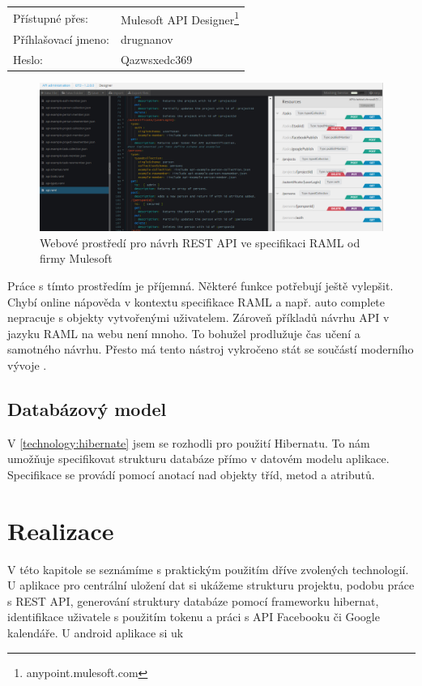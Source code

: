 \documentclass[thesis=B,czech]{FITthesis}[2012/06/26]
\begin{document}
\begin{tabular}{l l}
	Přístupné přes:&Mulesoft API Designer\footnote{anypoint.mulesoft.com}\\
	Příhlašovací jmeno:&drugnanov\\
	Heslo:&Qazwsxedc369\\
\end{tabular}

\begin{figure}[h!]\centering
	\includegraphics[width=1\textwidth]{pictures/gtd_raml_anypoint}
	\caption{Webové prostředí pro návrh REST API ve specifikaci RAML od firmy Mulesoft}\label{fig:gtd_raml_ide}
\end{figure}

Práce s tímto prostředím je příjemná. Některé funkce potřebují ještě vylepšit. Chybí online nápověda v kontextu specifikace RAML a např. auto complete nepracuje s objekty vytvořenými uživatelem. Zároveň příkladů návrhu API v jazyku RAML na webu není mnoho. To bohužel prodlužuje čas učení a samotného návrhu. Přesto má tento nástroj vykročeno stát se součástí moderního vývoje \cite{ws_raml_ddd}. 

\section{Databázový model}
\label{design:database_model}
V \ref{technology:hibernate} jsem se rozhodli pro použití Hibernatu. To nám umožňuje specifikovat strukturu databáze přímo v datovém modelu aplikace. Specifikace se provádí pomocí anotací nad objekty tříd, metod a atributů\cite{design_hibernate_annotations}. 

\chapter{Realizace}
V této kapitole se seznámíme s praktickým použitím dříve zvolených technologií. U aplikace pro centrální uložení dat si ukážeme strukturu projektu, podobu práce s REST API, generování struktury databáze pomocí frameworku hibernat, identifikace uživatele s použitím tokenu a práci s API Facebooku či Google kalendáře.
U android aplikace si uk
\newpage
\end{document}
